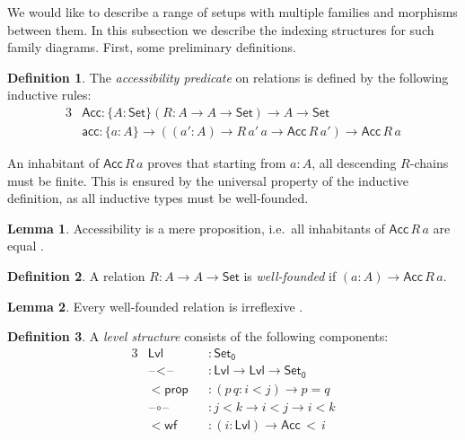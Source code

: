 \documentclass[a4paper,UKenglish,cleveref, autoref, thm-restate]{lipics-v2021}
\theoremstyle{remark}
\theoremstyle{definition}
\newtheorem{mydefinition}{Definition}
\newtheorem{mylemma}{Lemma}
\newcommand{\Set}[1]{\mathsf{Set_{#1}}}
\newcommand{\Seti}{\mathsf{Set}}
\newcommand{\blank}{\mathord{\hspace{1pt}\text{--}\hspace{1pt}}}
\newcommand{\mi}[1]{\mathit{#1}}
\newcommand{\Acc}{\mathsf{Acc}}
\newcommand{\acc}{\mathsf{acc}}
\newcommand{\Lvl}{\mathsf{Lvl}}
\begin{document}
We would like to describe a range of setups with multiple families and morphisms
between them. In this subsection we describe the indexing structures for such
family diagrams. First, some preliminary definitions.

\begin{mydefinition} The \emph{accessibility predicate} on relations is defined by the following
inductive rules:
\begin{alignat*}{3}
  & \Acc : \{A : \Seti\}(R : A \to A \to \Seti) \to A \to \Seti \\
  & \acc : \{a : A\} \to ((\mi{a'} : A) \to R\,\mi{a'}\,a \to \Acc\,R\,\mi{a'}) \to \Acc\,R\,a
\end{alignat*}
\end{mydefinition}

\noindent An inhabitant of $\Acc\,R\,a$ proves that starting from $a : A$, all
descending $R$-chains must be finite. This is ensured by the universal property
of the inductive definition, as all inductive types must be well-founded.

\begin{mylemma}\label{lem:accprop}
Accessibility is a mere proposition, i.e.\ all inhabitants of $\Acc\,R\,a$ are
equal \cite[Lemma 10.3.4]{hottbook}.
\end{mylemma}

\begin{mydefinition}
A relation $R : A \to A \to \Seti$ is \emph{well-founded} if $(a : A) \to
\Acc\,R\,a$.
\end{mydefinition}

\begin{mylemma}
Every well-founded relation is irreflexive \cite[Lemma 10.4.2]{hottbook}.
\end{mylemma}

\begin{mydefinition} A \emph{level structure} consists of the following components:
\begin{alignat*}{3}
  & \Lvl                  &&: \Set0 \\
  & \blank\!<\!\blank     &&: \Lvl \to \Lvl \to \Set0 \\
  & \mathsf{<\!prop }     &&: (p\,q : i < j) \to p = q \\
  & \blank\!\circ\!\blank &&: j < k \to i < j \to i < k \\
  & \mathsf{<\!wf}        &&: (i : \Lvl) \to \Acc\,<\,i
\end{alignat*}
\end{mydefinition}
\end{document}
